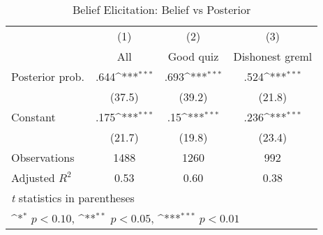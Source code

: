 \begin{table}[htbp]\centering
\def\sym#1{\ifmmode^{#1}\else\(^{#1}\)\fi}
\caption{Belief Elicitation: Belief vs Posterior}
\begin{tabular}{l*{3}{c}}
\hline\hline
                &\multicolumn{1}{c}{(1)}&\multicolumn{1}{c}{(2)}&\multicolumn{1}{c}{(3)}\\
                &\multicolumn{1}{c}{All}&\multicolumn{1}{c}{Good quiz}&\multicolumn{1}{c}{Dishonest greml}\\
\hline
Posterior prob. &     .644\sym{***}&     .693\sym{***}&     .524\sym{***}\\
                &   (37.5)         &   (39.2)         &   (21.8)         \\
Constant        &     .175\sym{***}&      .15\sym{***}&     .236\sym{***}\\
                &   (21.7)         &   (19.8)         &   (23.4)         \\
\hline
Observations    &     1488         &     1260         &      992         \\
Adjusted \(R^{2}\)&     0.53         &     0.60         &     0.38         \\
\hline\hline
\multicolumn{4}{l}{\footnotesize \textit{t} statistics in parentheses}\\
\multicolumn{4}{l}{\footnotesize \sym{*} \(p<0.10\), \sym{**} \(p<0.05\), \sym{***} \(p<0.01\)}\\
\end{tabular}
\end{table}

